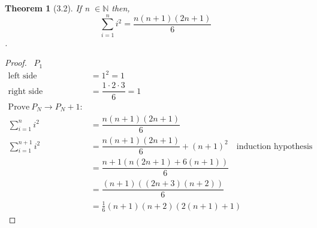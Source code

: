 \documentclass[12pt,std, fleqn]{article}
\newtheorem{theorem} {Theorem}
\begin{document}
\begin{theorem}[3.2] If n $\in \mathbb{N} $ then,
$$ \sum_{i=1}^{n} i^2 = \dfrac{n(n+1)(2n+1)}{6} $$.
\end{theorem}
\vspace{-1 cm}

\begin{proof} 
\  $P_{1}$\  
\begin{align*}
 \text{left side} &=  1^2 = 1\\
 \text{right side} &= \dfrac{1 \cdot 2 \cdot 3}{6} = 1 \\
\mbox{Prove}\ P_{N} \to P_{N} + 1 :\\
\sum_{i=1}^{n} i^2 &= \dfrac{n(n+1)(2n+1)}{6} \\
\sum_{i=1}^{n+1} i^2 &= \dfrac{n(n+1)(2n+1)}{6} + (n+1)^2 \quad \text{induction hypothesis} \\
&= \dfrac{n+1(n(2n+1) + 6(n+1))}{6} \\
&= \dfrac{(n+1)((2n+3)(n+2))}{6} \\
&= \frac{1}{6}(n+1)(n+2)(2(n+1)+1) 
\end{align*}
\end{proof}
\end{document}
